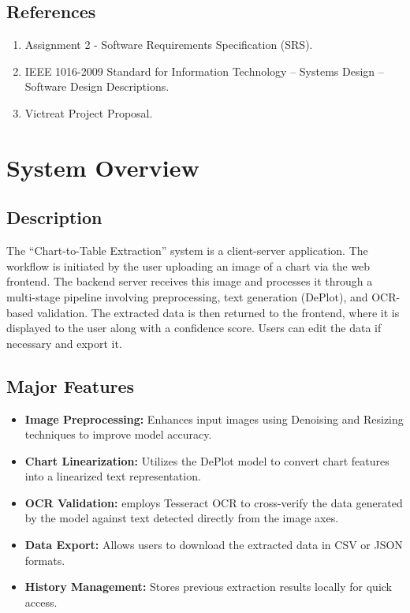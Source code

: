 \documentclass[12pt, a4paper]{article}
\begin{document}
\subsection{References}
\begin{enumerate}
    \item Assignment 2 - Software Requirements Specification (SRS).
    \item IEEE 1016-2009 Standard for Information Technology -- Systems Design -- Software Design Descriptions.
    \item Victreat Project Proposal.
\end{enumerate}

\section{System Overview}

\subsection{Description}
The ``Chart-to-Table Extraction'' system is a client-server application. The workflow is initiated by the user uploading an image of a chart via the web frontend. The backend server receives this image and processes it through a multi-stage pipeline involving preprocessing, text generation (DePlot), and OCR-based validation. The extracted data is then returned to the frontend, where it is displayed to the user along with a confidence score. Users can edit the data if necessary and export it.

\subsection{Major Features}
\begin{itemize}
    \item \textbf{Image Preprocessing:} Enhances input images using Denoising and Resizing techniques to improve model accuracy.
    \item \textbf{Chart Linearization:} Utilizes the DePlot model to convert chart features into a linearized text representation.
    \item \textbf{OCR Validation:} employs Tesseract OCR to cross-verify the data generated by the model against text detected directly from the image axes.
    \item \textbf{Data Export:} Allows users to download the extracted data in CSV or JSON formats.
    \item \textbf{History Management:} Stores previous extraction results locally for quick access.
\end{itemize}
\end{document}
